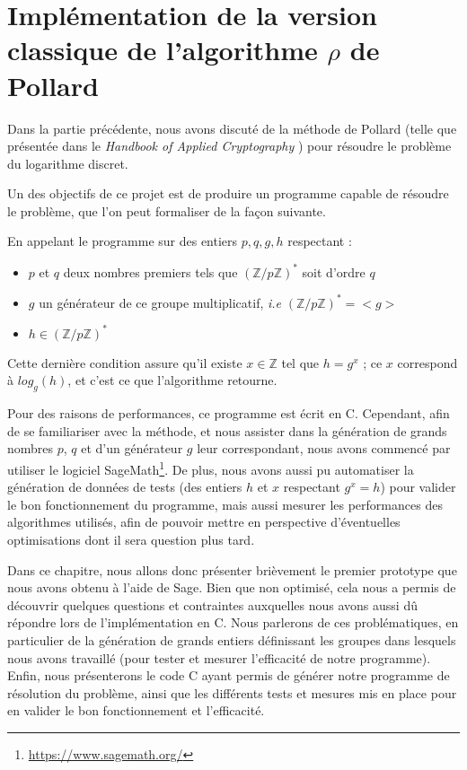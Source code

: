 \chapter{Implémentation de la version classique de l'algorithme \texorpdfstring{$\rho$}{Rho} de Pollard}
    Dans la partie précédente, nous avons discuté de la méthode de Pollard (telle que présentée dans le \textit{Handbook of Applied Cryptography} \autocite[106]{handbook}) pour résoudre le problème du logarithme discret.

    Un des objectifs de ce projet est de produire un programme capable de résoudre le problème, que l'on peut formaliser de la façon suivante.

    En appelant le programme sur des entiers $p, q, g, h$ respectant :
    \begin{itemize}
        \item[]$p$ et $q$ deux nombres premiers tels que $(\mathbb{Z}/p\mathbb{Z})^*$ soit d'ordre $q$
        \item[]$g$ un générateur de ce groupe multiplicatif, \textit{i.e} $(\mathbb{Z}/p\mathbb{Z})^* = <g>$
        \item[]$h \in (\mathbb{Z}/p\mathbb{Z})^*$
    \end{itemize}

	Cette dernière condition assure qu'il existe $x \in \mathbb{Z}$ tel que $h = g^x$ ; ce $x$ correspond à $log_g(h)$, et c'est ce que l'algorithme retourne.

    Pour des raisons de performances, ce programme est écrit en C.
    Cependant, afin de se familiariser avec la méthode, et nous assister dans la génération de grands nombres $p$, $q$ et d'un générateur $g$ leur correspondant, nous avons commencé par utiliser le logiciel SageMath\footnote{\url{https://www.sagemath.org/}}. De plus, nous avons aussi pu automatiser la génération de données de tests (des entiers $h$ et $x$ respectant $g^x = h$) pour valider le bon fonctionnement du programme, mais aussi mesurer les performances des algorithmes utilisés, afin de pouvoir mettre en perspective d'éventuelles optimisations dont il sera question plus tard.

    Dans ce chapitre, nous allons donc présenter brièvement le premier prototype que nous avons obtenu à l'aide de Sage.
    Bien que non optimisé, cela nous a permis de découvrir quelques questions et contraintes auxquelles nous avons aussi dû répondre lors de l'implémentation en C.
    Nous parlerons de ces problématiques, en particulier de la génération de grands entiers définissant les groupes dans lesquels nous avons travaillé (pour tester et mesurer l'efficacité de notre programme).
    Enfin, nous présenterons le code C ayant permis de générer notre programme de résolution du problème, ainsi que les différents tests et mesures mis en place pour en valider le bon fonctionnement et l'efficacité.
